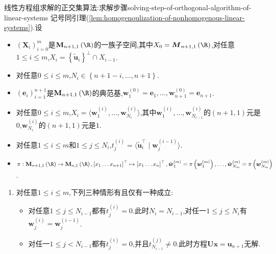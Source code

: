\begin{theorem}{线性方程组求解的正交集算法:求解步骤}{solving-step-of-orthogonal-algorithm-of-linear-systems}
	记号同引理(\ref{lem:homogenoulization-of-nonhomogenous-linear-systems}).设
	\begin{itemize}
		\item $\left(\boldsymbol{X}_{i}\right)_{i=0}^{m}$是$\mathbf{M}_{n+1,1}\left(\R\right)$的一族子空间,其中$X_{0}=\boldsymbol{M}_{n+1,1}\left(\R\right)$,对任意$1\leq i\leq m$,$X_{i}=\left\{\tilde{\boldsymbol{u}}_{i}\right\}^{\perp}\cap X_{i-1}$.
		\item 对任意$0\leq i\leq m$,$N_{i}\in\left\{n+1-i,\ldots,n+1\right\}$.
		\item $\left(\boldsymbol{e}_{i}\right)_{i=1}^{n+1}$是$\mathbf{M}_{n+1,1}\left(\R\right)$的典范基,$\boldsymbol{w}_{1}^{\left(0\right)}=\boldsymbol{e}_{1},\ldots,\boldsymbol{w}_{n+1}^{\left(0\right)}=\boldsymbol{e}_{n+1}$.
		\item 对任意$0\leq i\leq m$,$X_{i}=\langle\boldsymbol{w}_{1}^{\left(i\right)},\ldots,\boldsymbol{w}_{N_{i}}^{\left(i\right)}\rangle$,其中$\boldsymbol{w}_{1}^{\left(i\right)},\ldots,\boldsymbol{w}_{N_{i-1}}^{\left(i\right)}$的$\left(n+1,1\right)$元是$0$,$\boldsymbol{w}_{N_{i}}^{\left(i\right)}$的$\left(n+1,1\right)$元是$1$.
		\item 对任意$1\leq i\leq m$和$1\leq j\leq N_{i}$,$t_{j}^{\left(i\right)}=\langle\tilde{\boldsymbol{u}}_{i}^{\top}\mid\boldsymbol{w}_{j}^{\left(i-1\right)}\rangle$.
		\item $\pi:\mathbf{M}_{n+1,1}\left(\R\right)\to\mathbf{M}_{n,1}\left(\R\right),\left[x_{1}\ldots x_{n+1}\right]^{\top}\mapsto\left[x_{1}\ldots x_{n}\right]^{\top},\hat{\boldsymbol{w}}_{1}^{\left(m\right)}=\pi\left(\boldsymbol{w}_{1}^{\left(m\right)}\right),\ldots,\hat{\boldsymbol{w}}_{N_{m}}^{\left(m\right)}=\pi\left(\boldsymbol{w}_{N_{m}}^{\left(m\right)}\right)$.
	\end{itemize}
	\begin{enumerate}
		\item 对任意$1\leq i\leq m$,下列三种情形有且仅有一种成立:
		\begin{itemize}
			\item 对任意$1\leq j\leq N_{i-1}$都有$t_{j}^{\left(i\right)}=0$.此时$N_{i}=N_{i-1}$,对任一$1\leq j\leq N_{i}$有$\boldsymbol{w}_{j}^{\left(i\right)}=\boldsymbol{w}_{j}^{\left(i-1\right)}$.
			\item 对任一$1\leq j<N_{i-1}$都有$t_{j}^{\left(i\right)}=0$,并且$t_{N_{i-1}}^{\left(j\right)}\neq 0$.此时方程$\boldsymbol{U}\boldsymbol{x}=\boldsymbol{u}_{n+1}$无解.

\end{itemize}
\end{enumerate}
\end{theorem}
